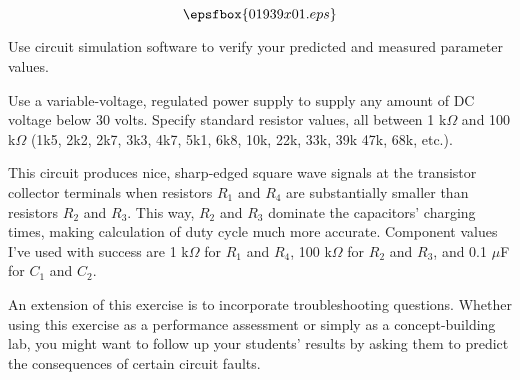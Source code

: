 

$$\epsfbox{01939x01.eps}$$

\vfil \eject






Use circuit simulation software to verify your predicted and measured parameter values.







Use a variable-voltage, regulated power supply to supply any amount of DC voltage below 30 volts.  Specify standard resistor values, all between 1 k$\Omega$ and 100 k$\Omega$ (1k5, 2k2, 2k7, 3k3, 4k7, 5k1, 6k8, 10k, 22k, 33k, 39k 47k, 68k, etc.). 

This circuit produces nice, sharp-edged square wave signals at the transistor collector terminals when resistors $R_1$ and $R_4$ are substantially smaller than resistors $R_2$ and $R_3$.  This way, $R_2$ and $R_3$ dominate the capacitors' charging times, making calculation of duty cycle much more accurate.  Component values I've used with success are 1 k$\Omega$ for $R_1$ and $R_4$, 100 k$\Omega$ for $R_2$ and $R_3$, and 0.1 $\mu$F for $C_1$ and $C_2$.

An extension of this exercise is to incorporate troubleshooting questions.  Whether using this exercise as a performance assessment or simply as a concept-building lab, you might want to follow up your students' results by asking them to predict the consequences of certain circuit faults.




